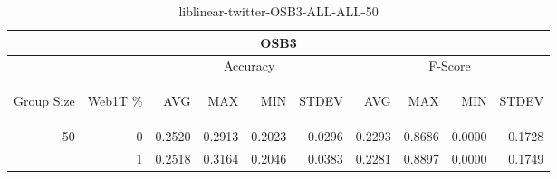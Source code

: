\begin{center}
\begin{table}[htbp]
\begin{tabular}{ | r | r | r | r | r | r | r | r | r | r |}
\hline
\multicolumn{10}{|c|}{OSB3}\\
\hline
 & & \multicolumn{4}{|c|}{Accuracy} & \multicolumn{4}{|c|}{F-Score}\\ \cline{3-10}
\begin{sideways}Group Size\end{sideways} & \begin{sideways}Web1T \%\end{sideways} & \begin{sideways}AVG\end{sideways} & \begin{sideways}MAX\end{sideways} & \begin{sideways}MIN\end{sideways} & \begin{sideways}STDEV\end{sideways} & \begin{sideways}AVG\end{sideways} & \begin{sideways}MAX\end{sideways} & \begin{sideways}MIN\end{sideways} & \begin{sideways}STDEV\end{sideways}\\
\hline
\multirow{2}{*}{50}
 & 0 & 0.2520 & 0.2913 & 0.2023 & 0.0296 & 0.2293 & 0.8686 & 0.0000 & 0.1728\\ \cline{2-10}
 & 1 & 0.2518 & 0.3164 & 0.2046 & 0.0383 & 0.2281 & 0.8897 & 0.0000 & 0.1749\\ \cline{2-10}
\hline
\end{tabular}
\caption{liblinear-twitter-OSB3-ALL-ALL-50}
\end{table}
\end{center}

